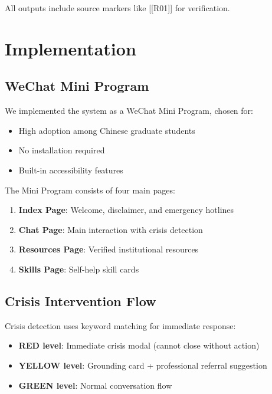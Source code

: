 \documentclass[preprint,12pt]{elsarticle}
\begin{document}
All outputs include source markers like [[R01]] for verification.

\section{Implementation}

\subsection{WeChat Mini Program}

We implemented the system as a WeChat Mini Program, chosen for:

\begin{itemize}
    \item High adoption among Chinese graduate students
    \item No installation required
    \item Built-in accessibility features
\end{itemize}

The Mini Program consists of four main pages:

\begin{enumerate}
    \item \textbf{Index Page}: Welcome, disclaimer, and emergency hotlines
    \item \textbf{Chat Page}: Main interaction with crisis detection
    \item \textbf{Resources Page}: Verified institutional resources
    \item \textbf{Skills Page}: Self-help skill cards
\end{enumerate}

\subsection{Crisis Intervention Flow}

Crisis detection uses keyword matching for immediate response:

\begin{itemize}
    \item \textbf{RED level}: Immediate crisis modal (cannot close without action)
    \item \textbf{YELLOW level}: Grounding card + professional referral suggestion
    \item \textbf{GREEN level}: Normal conversation flow
\end{itemize}
\end{document}
